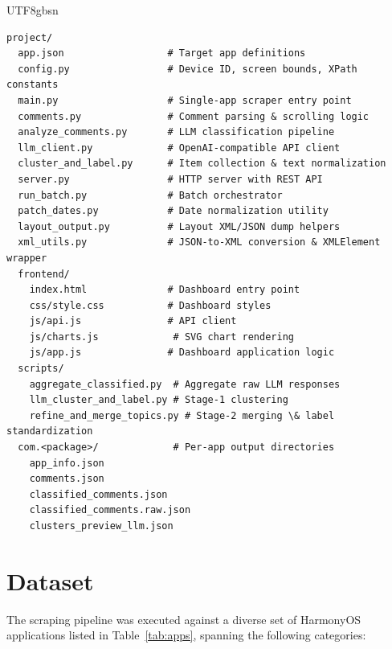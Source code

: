 \documentclass[11pt,a4paper]{article}
\begin{document}
\begin{CJK*}{UTF8}{gbsn}
\begin{lstlisting}[caption={Project directory layout.}, label=lst:structure]
project/
  app.json                  # Target app definitions
  config.py                 # Device ID, screen bounds, XPath constants
  main.py                   # Single-app scraper entry point
  comments.py               # Comment parsing & scrolling logic
  analyze_comments.py       # LLM classification pipeline
  llm_client.py             # OpenAI-compatible API client
  cluster_and_label.py      # Item collection & text normalization
  server.py                 # HTTP server with REST API
  run_batch.py              # Batch orchestrator
  patch_dates.py            # Date normalization utility
  layout_output.py          # Layout XML/JSON dump helpers
  xml_utils.py              # JSON-to-XML conversion & XMLElement wrapper
  frontend/
    index.html              # Dashboard entry point
    css/style.css           # Dashboard styles
    js/api.js               # API client
    js/charts.js             # SVG chart rendering
    js/app.js               # Dashboard application logic
  scripts/
    aggregate_classified.py  # Aggregate raw LLM responses
    llm_cluster_and_label.py # Stage-1 clustering
    refine_and_merge_topics.py # Stage-2 merging \& label standardization
  com.<package>/             # Per-app output directories
    app_info.json
    comments.json
    classified_comments.json
    classified_comments.raw.json
    clusters_preview_llm.json
\end{lstlisting}


\section{Dataset}

The scraping pipeline was executed against a diverse set of HarmonyOS applications listed in Table~\ref{tab:apps}, spanning the following categories:


\end{CJK*}
\end{document}
